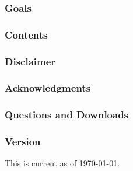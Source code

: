 

\subsubsection*{Goals}



\subsubsection*{Contents}



\subsubsection*{Disclaimer}



\subsubsection*{Acknowledgments}



\subsubsection*{Questions and Downloads}



\subsubsection*{Version}

This  is current as of \today.
